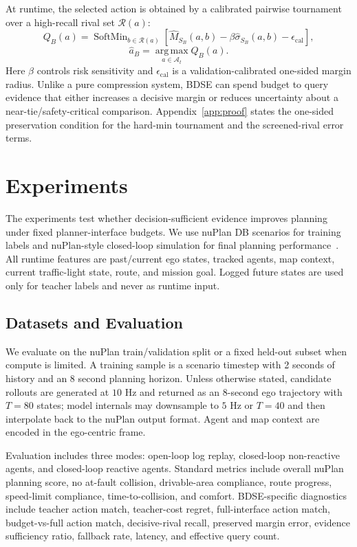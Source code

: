 \documentclass{article}
\newcommand{\A}{\mathcal{A}}
\newcommand{\R}{\mathcal{R}}
\newcommand{\argmax}{\operatorname*{arg\,max}}
\begin{document}
At runtime, the selected action is obtained by a calibrated pairwise tournament over a high-recall rival set $\R(a)$:
\begin{equation}
    Q_B(a)=
    \operatorname{SoftMin}_{b\in\R(a)}
    \left[
    \hat M_{S_B}(a,b)-\beta\hat\sigma_{S_B}(a,b)-\epsilon_{\mathrm{cal}}
    \right],
    \label{eq:tournament}
\end{equation}
\begin{equation}
    \hat a_B=\argmax_{a\in\A_t}Q_B(a).
    \label{eq:selected_action}
\end{equation}
Here $\beta$ controls risk sensitivity and $\epsilon_{\mathrm{cal}}$ is a validation-calibrated one-sided margin radius. Unlike a pure compression system, BDSE can spend budget to query evidence that either increases a decisive margin or reduces uncertainty about a near-tie/safety-critical comparison. Appendix~\ref{app:proof} states the one-sided preservation condition for the hard-min tournament and the screened-rival error terms.


\section{Experiments}
\label{sec:experiments}

The experiments test whether decision-sufficient evidence improves planning under fixed planner-interface budgets. We use nuPlan DB scenarios for training labels and nuPlan-style closed-loop simulation for final planning performance~\cite{caesar2021nuplan}. All runtime features are past/current ego states, tracked agents, map context, current traffic-light state, route, and mission goal. Logged future states are used only for teacher labels and never as runtime input.

\subsection{Datasets and Evaluation}
We evaluate on the nuPlan train/validation split or a fixed held-out subset when compute is limited. A training sample is a scenario timestep with 2 seconds of history and an 8 second planning horizon. Unless otherwise stated, candidate rollouts are generated at $10$ Hz and returned as an 8-second ego trajectory with $T=80$ states; model internals may downsample to $5$ Hz or $T=40$ and then interpolate back to the nuPlan output format. Agent and map context are encoded in the ego-centric frame.

Evaluation includes three modes: open-loop log replay, closed-loop non-reactive agents, and closed-loop reactive agents. Standard metrics include overall nuPlan planning score, no at-fault collision, drivable-area compliance, route progress, speed-limit compliance, time-to-collision, and comfort. BDSE-specific diagnostics include teacher action match, teacher-cost regret, full-interface action match, budget-vs-full action match, decisive-rival recall, preserved margin error, evidence sufficiency ratio, fallback rate, latency, and effective query count.
\end{document}
